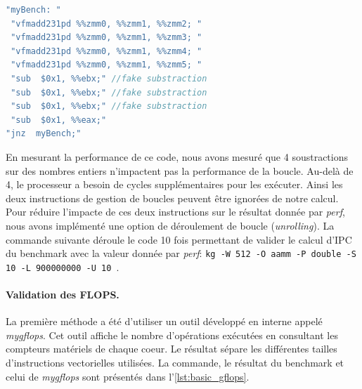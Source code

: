         \begin{lstlisting}[label=code:sub ,language=C, caption=Mesure de l'impact de la soustraction]
"myBench: " 
 "vfmadd231pd %%zmm0, %%zmm1, %%zmm2; "
 "vfmadd231pd %%zmm0, %%zmm1, %%zmm3; "
 "vfmadd231pd %%zmm0, %%zmm1, %%zmm4; "
 "vfmadd231pd %%zmm0, %%zmm1, %%zmm5; "
 "sub  $0x1, %%ebx;" //fake substraction
 "sub  $0x1, %%ebx;" //fake substraction
 "sub  $0x1, %%ebx;" //fake substraction
 "sub  $0x1, %%eax;" 
"jnz  myBench;"	  
        \end{lstlisting}
        
        
        En mesurant la performance de ce code, nous avons mesuré que 4 soustractions sur des nombres entiers n'impactent pas la performance de la boucle. Au-delà de 4, le processeur a besoin de cycles supplémentaires pour les exécuter. Ainsi les deux instructions de gestion de boucles peuvent être ignorées de notre calcul. Pour réduire l'impacte de ces deux instructions sur le résultat donnée par \textit{perf}, nous avons implémenté une option de déroulement de boucle (\textit{unrolling}). La commande suivante déroule le code 10 fois permettant de valider le calcul d'IPC du benchmark avec la valeur donnée par \textit{perf}: \verb|kg -W 512 -O aamm -P double -S 10 -L 900000000 -U 10 |.
        
        
        
        
        \paragraph{Validation des FLOPS.} La première méthode a été d'utiliser un outil développé en interne appelé \textit{mygflops}. Cet outil affiche le nombre d'opérations exécutées en consultant les compteurs matériels de chaque coeur. Le résultat sépare les différentes tailles d'instructions vectorielles utilisées. La commande, le résultat du benchmark et celui de \textit{mygflops} sont présentés dans l'\autoref{lst:basic_gflops}. 
        
